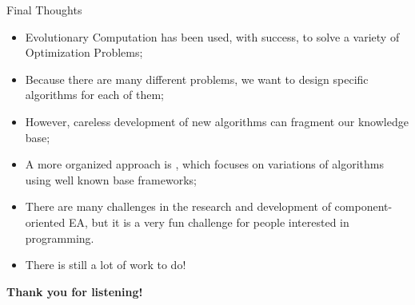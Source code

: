 \documentclass[aspectratio=169]{beamer}
\begin{document}
\begin{frame}{Final Thoughts}
  \begin{itemize}
  \item Evolutionary Computation has been used, with success, to solve
    a variety of Optimization Problems;\medskip

  \item Because there are many different problems, we want to design
    specific algorithms for each of them;\medskip

  \item However, careless development of new algorithms can fragment
    our knowledge base;\medskip

  \item A more organized approach is , which focuses on variations of algorithms using well
    known base frameworks;\medskip

  \item There are many challenges in the research and development of
    component-oriented EA, but it is a very fun challenge for people
    interested in programming.\medskip

  \item There is still a lot of work to do!
  \end{itemize}
\end{frame}

\begin{frame}
  \begin{center}
  {\large{\bf
    Thank you for listening!
  }}
  \end{center}

\end{frame}
\end{document}
